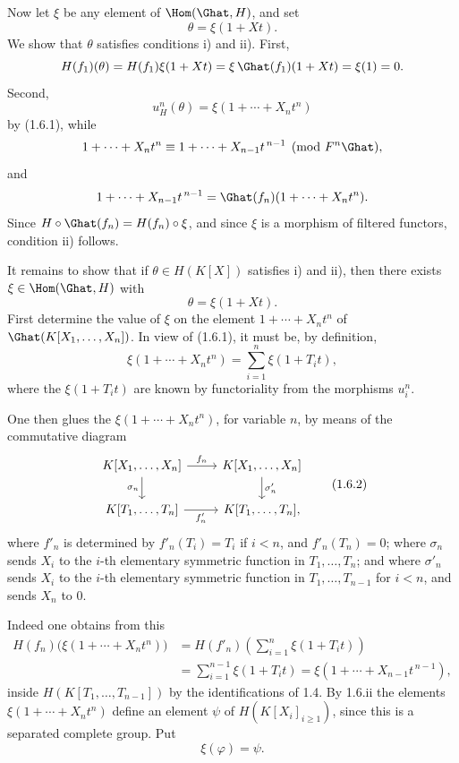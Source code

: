 \documentclass[11pt]{article}
\begin{document}
Now let \(\xi\) be any element of \(\Hom(\Ghat,H)\), and set
\[
  \theta=\xi(1+Xt).
\]
We show that \(\theta\) satisfies conditions i) and ii). First,
\[
  H(f_1)(\theta)=H(f_1)\xi(1+Xt)
  =\xi\,\Ghat(f_1)(1+Xt)=\xi(1)=0.
\]
Second,
\[
  u_H^n(\theta)=\xi(1+\cdots+X_nt^n)
\]
by (1.6.1), while
\[
  1+\cdots+X_nt^n\equiv 1+\cdots+X_{n-1}t^{\,n-1}
  \pmod{F^n\Ghat},
\]
and
\[
  1+\cdots+X_{n-1}t^{\,n-1}=\Ghat(f_n)(1+\cdots+X_nt^n).
\]
Since \(H\circ \Ghat(f_n)=H(f_n)\circ \xi\), and since \(\xi\) is a morphism of filtered functors, condition ii) follows.

It remains to show that if \(\theta\in H(K[X])\) satisfies i) and ii), then there exists \(\xi\in\Hom(\Ghat,H)\) with
\[
  \theta=\xi(1+Xt).
\]
First determine the value of \(\xi\) on the element \(1+\cdots+X_nt^n\) of \(\Ghat(K[X_1,\ldots,X_n])\). In view of (1.6.1), it must be, by definition,
\[
  \xi(1+\cdots+X_nt^n)
  =
  \sum_{i=1}^n \xi(1+T_it),
\]
where the \(\xi(1+T_it)\) are known by functoriality from the morphisms \(u_i^n\).

One then glues the \(\xi(1+\cdots+X_nt^n)\), for variable \(n\), by means of the commutative diagram
\[
\begin{tikzcd}
K[X_1,\ldots,X_n] \arrow[r,"f_n"] \arrow[d,"\sigma_n"'] &
K[X_1,\ldots,X_n] \arrow[d,"\sigma'_n"]\\
K[T_1,\ldots,T_n] \arrow[r,"f'_n"'] &
K[T_1,\ldots,T_n],
\end{tikzcd}
\tag{1.6.2}
\]
where \(f'_n\) is determined by \(f'_n(T_i)=T_i\) if \(i<n\), and \(f'_n(T_n)=0\); where \(\sigma_n\) sends \(X_i\) to the \(i\)-th elementary symmetric function in \(T_1,\ldots,T_n\); and where \(\sigma'_n\) sends \(X_i\) to the \(i\)-th elementary symmetric function in \(T_1,\ldots,T_{n-1}\) for \(i<n\), and sends \(X_n\) to \(0\).

Indeed one obtains from this
\[
\begin{aligned}
H(f_n)\bigl(\xi(1+\cdots+X_nt^n)\bigr)
&=H(f'_n)\left(\sum_{i=1}^n \xi(1+T_it)\right)\\
&=\sum_{i=1}^{n-1}\xi(1+T_it)
   =\xi(1+\cdots+X_{n-1}t^{\,n-1}),
\end{aligned}
\]
inside \(H(K[T_1,\ldots,T_{n-1}])\) by the identifications of 1.4. By 1.6.ii the elements \(\xi(1+\cdots+X_nt^n)\) define an element \(\psi\) of \(H(K[X_i]_{i\geq 1})\), since this is a separated complete group. Put
\[
  \xi(\varphi)=\psi .
\]
\end{document}
